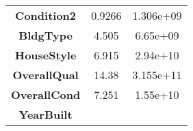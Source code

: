 \documentclass[]{article}
\begin{document}
\begin{longtable}[c]{@{}ccc@{}}
\begin{minipage}[t]{0.25\columnwidth}
\textbf{Condition2}
\strut\end{minipage} &
\begin{minipage}[t]{0.16\columnwidth}\centering\strut
0.9266
\strut\end{minipage} &
\begin{minipage}[t]{0.19\columnwidth}\centering\strut
1.306e+09
\strut\end{minipage}\tabularnewline
\begin{minipage}[t]{0.25\columnwidth}\centering\strut
\textbf{BldgType}
\strut\end{minipage} &
\begin{minipage}[t]{0.16\columnwidth}\centering\strut
4.505
\strut\end{minipage} &
\begin{minipage}[t]{0.19\columnwidth}\centering\strut
6.65e+09
\strut\end{minipage}\tabularnewline
\begin{minipage}[t]{0.25\columnwidth}\centering\strut
\textbf{HouseStyle}
\strut\end{minipage} &
\begin{minipage}[t]{0.16\columnwidth}\centering\strut
6.915
\strut\end{minipage} &
\begin{minipage}[t]{0.19\columnwidth}\centering\strut
2.94e+10
\strut\end{minipage}\tabularnewline
\begin{minipage}[t]{0.25\columnwidth}\centering\strut
\textbf{OverallQual}
\strut\end{minipage} &
\begin{minipage}[t]{0.16\columnwidth}\centering\strut
14.38
\strut\end{minipage} &
\begin{minipage}[t]{0.19\columnwidth}\centering\strut
3.155e+11
\strut\end{minipage}\tabularnewline
\begin{minipage}[t]{0.25\columnwidth}\centering\strut
\textbf{OverallCond}
\strut\end{minipage} &
\begin{minipage}[t]{0.16\columnwidth}\centering\strut
7.251
\strut\end{minipage} &
\begin{minipage}[t]{0.19\columnwidth}\centering\strut
1.55e+10
\strut\end{minipage}\tabularnewline
\begin{minipage}[t]{0.25\columnwidth}\centering\strut
\textbf{YearBuilt}

\end{minipage}
\end{longtable}
\end{document}
